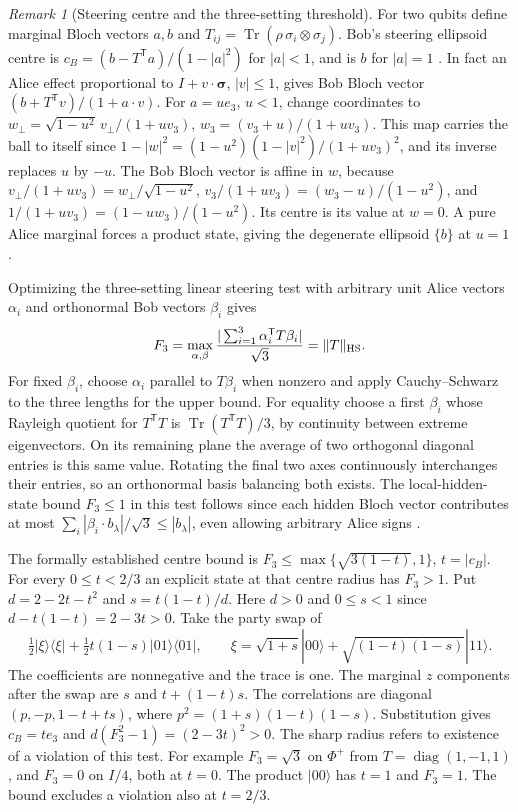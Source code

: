 \documentclass[aps,pra,onecolumn,superscriptaddress,nofootinbib,10pt]{revtex4-2}
\theoremstyle{definition}
\theoremstyle{remark}
\newtheorem{remark}[theorem]{Remark}
\newcommand{\tr}{\operatorname{Tr}}
\begin{document}
\begin{remark}[Steering centre and the three-setting threshold]
\label{ob:steering}
For two qubits define marginal Bloch vectors \(a,b\) and
\(T_{ij}=\tr(\rho\,\sigma_i\otimes\sigma_j)\).
Bob's steering ellipsoid centre is
\(c_B=(b-T^{\mathsf T}a)/(1-|a|^2)\) for \(|a|<1\), and is
\(b\) for \(|a|=1\) \cite{obr:jevtic}. In fact an Alice effect
proportional to \(I+v\cdot\boldsymbol{\sigma}\), \(|v|\le1\),
gives Bob Bloch vector \((b+T^{\mathsf T}v)/(1+a\cdot v)\).
For \(a=ue_3\), \(u<1\), change coordinates to
\(w_\perp=\sqrt{1-u^2}\,v_\perp/(1+uv_3)\),
\(w_3=(v_3+u)/(1+uv_3)\).
This map carries the ball to itself since
\(1-|w|^2=(1-u^2)(1-|v|^2)/(1+uv_3)^2\), and its inverse replaces
\(u\) by \(-u\). The Bob Bloch vector is affine in \(w\), because
\(v_\perp/(1+uv_3)=w_\perp/\sqrt{1-u^2}\),
\(v_3/(1+uv_3)=(w_3-u)/(1-u^2)\), and
\(1/(1+uv_3)=(1-u w_3)/(1-u^2)\). Its centre is its value at
\(w=0\). A pure Alice marginal forces a product state, giving the
degenerate ellipsoid \(\{b\}\) at \(u=1\).

Optimizing the three-setting
linear steering test with arbitrary unit Alice vectors \(\alpha_i\)
and orthonormal Bob vectors \(\beta_i\) gives
\[
 F_3=\max_{\alpha,\beta}\frac{|\sum_{i=1}^3
          \alpha_i^{\mathsf T}T\beta_i|}{\sqrt3}=\|T\|_{\rm HS}.
\]
For fixed \(\beta_i\), choose \(\alpha_i\) parallel to \(T\beta_i\)
when nonzero and apply Cauchy--Schwarz to the three lengths
for the upper bound. For equality choose a first \(\beta_i\) whose
Rayleigh quotient for \(T^{\mathsf T}T\) is \(\tr(T^{\mathsf T}T)/3\),
by continuity between extreme eigenvectors. On its remaining plane
the average of two orthogonal diagonal entries is this same value.
Rotating the final two axes continuously interchanges their entries,
so an orthonormal basis balancing both exists. The local-hidden-state
bound \(F_3\le1\) in this test follows since each hidden Bloch vector
contributes at most \(\sum_i|\beta_i\cdot b_{\lambda}|/\sqrt3
\le |b_\lambda|\), even allowing arbitrary Alice signs
\cite{obr:cjwr}.

The formally established centre bound \cite{obr:leansteering} is
\(F_3\le\max\{\sqrt{3(1-t)},1\}\), \(t=|c_B|\). For every
\(0\le t<2/3\) an explicit state at that centre radius has \(F_3>1\).
Put \(d=2-2t-t^2\) and \(s=t(1-t)/d\). Here \(d>0\) and \(0\le s<1\)
since \(d-t(1-t)=2-3t>0\). Take the party swap of
\[
 \tfrac12|\xi\rangle\langle\xi|+\tfrac12 t(1-s)|01\rangle\langle01|,
 \qquad
 \xi=\sqrt{1+s}|00\rangle+\sqrt{(1-t)(1-s)}|11\rangle.
\]
The coefficients are nonnegative and the trace is one.
The marginal \(z\) components after the swap are \(s\) and
\(t+(1-t)s\). The correlations are diagonal
\((p,-p,1-t+ts)\), where \(p^2=(1+s)(1-t)(1-s)\).
Substitution gives \(c_B=te_3\) and
\(d(F_3^2-1)=(2-3t)^2>0\).
The sharp radius refers to existence of a violation of this test.
For example \(F_3=\sqrt3\) on \(\Phi^+\) from
\(T=\operatorname{diag}(1,-1,1)\), and \(F_3=0\) on \(I/4\),
both at \(t=0\). The product \(|00\rangle\) has \(t=1\) and
\(F_3=1\). The bound excludes a violation also at \(t=2/3\).
\end{remark}
\end{document}
